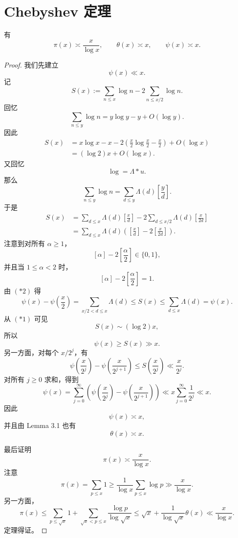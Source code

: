 \section{Chebyshev 定理}

\begin{theorem}[原文 Theorem 3.3]
	有
	\[
		\pi(x)\asymp \frac{x}{\log x},
		\qquad
		\theta(x)\asymp x,
		\qquad
		\psi(x)\asymp x.
	\]
\end{theorem}

\begin{proof}
	我们先建立
	\[
		\psi(x)\ll x.
	\]
	记
	\[
		S(x):=\sum_{n\leq x}\log n-2\sum_{n\leq x/2}\log n.
	\]
	回忆
	\[
		\sum_{n\leq y}\log n=y\log y-y+O(\log y).
	\]
	因此
	\begin{equation}
	\begin{aligned}
		S(x)
		&=
		x\log x-x
		-2\left(\frac x2\log\frac x2-\frac x2\right)
		+O(\log x) \\
		&=
		(\log 2)x+O(\log x).
	\end{aligned}
	\tag{*1}
	\end{equation}
	又回忆
	\[
		\log=\Lambda*u.
	\]
	那么
	\[
		\sum_{n\leq y}\log n
		=
		\sum_{d\leq y}\Lambda(d)\left[\frac yd\right].
	\]
	于是
	\begin{equation}
	\begin{aligned}
		S(x)
		&=
		\sum_{d\leq x}\Lambda(d)\left[\frac xd\right]
		-
		2\sum_{d\leq x/2}\Lambda(d)\left[\frac{x}{2d}\right] \\
		&=
		\sum_{d\leq x}\Lambda(d)
		\left(\left[\frac xd\right]-2\left[\frac{x}{2d}\right]\right).
	\end{aligned}
	\tag{*2}
	\end{equation}
	注意到对所有 $\alpha\geq 1$，
	\[
		[\alpha]-2\left[\frac\alpha2\right]\in\{0,1\},
	\]
	并且当 $1\leq \alpha<2$ 时，
	\[
		[\alpha]-2\left[\frac\alpha2\right]=1.
	\]
	由 $(*2)$ 得
	\[
		\psi(x)-\psi\left(\frac x2\right)
		=
		\sum_{x/2<d\leq x}\Lambda(d)
		\leq
		S(x)
		\leq
		\sum_{d\leq x}\Lambda(d)=\psi(x).
	\]
	从 $(*1)$ 可见
	\[
		S(x)\sim (\log 2)x,
	\]
	所以
	\[
		\psi(x)\geq S(x)\gg x.
	\]
	另一方面，对每个 $x/2^j$，有
	\[
		\psi\left(\frac{x}{2^j}\right)
		-
		\psi\left(\frac{x}{2^{j+1}}\right)
		\leq
		S\left(\frac{x}{2^j}\right)
		\ll
		\frac{x}{2^j}.
	\]
	对所有 $j\geq 0$ 求和，得到
	\[
		\psi(x)
		=
		\sum_{j=0}^\infty
		\left(
			\psi\left(\frac{x}{2^j}\right)
			-
			\psi\left(\frac{x}{2^{j+1}}\right)
		\right)
		\ll
		x\sum_{j=0}^\infty\frac1{2^j}
		\ll x.
	\]
	因此
	\[
		\psi(x)\asymp x,
	\]
	并且由 Lemma 3.1 也有
	\[
		\theta(x)\asymp x.
	\]

	最后证明
	\[
		\pi(x)\asymp \frac{x}{\log x}.
	\]
	注意
	\[
		\pi(x)=\sum_{p\leq x}1
		\geq
		\frac1{\log x}\sum_{p\leq x}\log p
		\gg
		\frac{x}{\log x}.
	\]
	另一方面，
	\[
		\pi(x)
		\leq
		\sum_{p\leq \sqrt{x}}1
		+
		\sum_{\sqrt{x}<p\leq x}\frac{\log p}{\log\sqrt{x}}
		\leq
		\sqrt{x}+\frac1{\log\sqrt{x}}\theta(x)
		\ll
		\frac{x}{\log x}.
	\]
	定理得证。
\end{proof}

